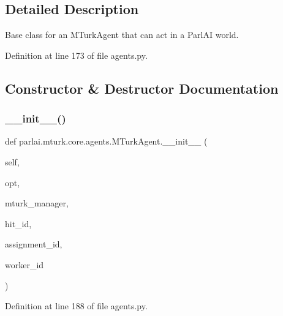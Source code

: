 \subsection{Detailed Description}
\begin{DoxyVerb}Base class for an MTurkAgent that can act in a ParlAI world.
\end{DoxyVerb}
 

Definition at line 173 of file agents.\+py.



\subsection{Constructor \& Destructor Documentation}
\mbox{\label{classparlai_1_1mturk_1_1core_1_1agents_1_1MTurkAgent_a0b4906e8bb4fa84fcb33f22974743e78}} 
\subsubsection{\texorpdfstring{\+\_\+\+\_\+init\+\_\+\+\_\+()}{\_\_init\_\_()}}
{\footnotesize\ttfamily def parlai.\+mturk.\+core.\+agents.\+M\+Turk\+Agent.\+\_\+\+\_\+init\+\_\+\+\_\+ (\begin{DoxyParamCaption}\item[{}]{self,  }\item[{}]{opt,  }\item[{}]{mturk\+\_\+manager,  }\item[{}]{hit\+\_\+id,  }\item[{}]{assignment\+\_\+id,  }\item[{}]{worker\+\_\+id }\end{DoxyParamCaption})}



Definition at line 188 of file agents.\+py.


